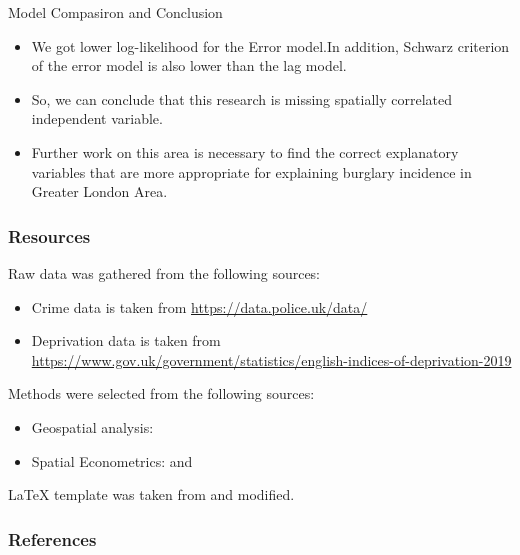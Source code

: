 \documentclass[10pt, aspectratio=169]{beamer}
\begin{document}
\begin{frame}{Model Compasiron and Conclusion}

    \begin{itemize}
         
        \item \textbf{}We got lower log-likelihood for the Error model.In addition, Schwarz criterion of the error model is also lower than the lag model.
        \item \textbf{}So, we can conclude that this research is missing spatially correlated independent variable.
        \item \textbf{}Further work on this area is necessary to find the correct explanatory variables that are more appropriate for explaining burglary incidence in Greater London Area.
        
    \end{itemize}
    
\end{frame}


\begin{frame}[t]
    \frametitle{Resources}
    Raw data was gathered from the following sources:
    \begin{itemize}
        \item Crime data is taken from \url{https://data.police.uk/data/}
        \item Deprivation data is taken from \url{https://www.gov.uk/government/statistics/english-indices-of-deprivation-2019}
    \end{itemize}

    Methods were selected from the following sources:
    \begin{itemize}
        \item Geospatial analysis: \citet{lawhead2019learning}
        \item Spatial Econometrics: \citet{anselin1988spatial} and \citet{kopczewska2020applied}
    \end{itemize}

    LaTeX template was taken from \citet{GaudeckerEconProjectTemplates} and modified.

    \note{~}
\end{frame}

\begin{frame}[allowframebreaks]
    \frametitle{References}
    \renewcommand{\bibfont}{\normalfont\footnotesize}
    \printbibliography
\end{frame}
\end{document}
